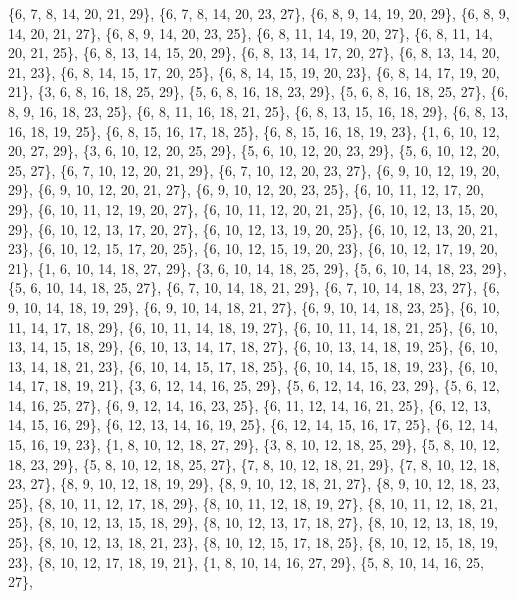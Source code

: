 \documentclass[11pt,a4paper]{article}
\begin{document}
{\{6, 7, 8, 14, 20, 21, 29\}, \{6, 7, 8, 14, 20, 23, 27\}, \{6, 8, 9, 14, 19, 20, 29\}, \{6, 8, 9, 14, 20, 21, 27\}, \{6, 8, 9, 14, 20, 23, 25\},
\{6, 8, 11, 14, 19, 20, 27\}, \{6, 8, 11, 14, 20, 21, 25\}, \{6, 8, 13, 14, 15, 20, 29\}, \{6, 8, 13, 14, 17, 20, 27\}, \{6, 8, 13, 14, 20, 21, 23\},
\{6, 8, 14, 15, 17, 20, 25\}, \{6, 8, 14, 15, 19, 20, 23\}, \{6, 8, 14, 17, 19, 20, 21\}, \{3, 6, 8, 16, 18, 25, 29\}, \{5, 6, 8, 16, 18, 23, 29\},
\{5, 6, 8, 16, 18, 25, 27\}, \{6, 8, 9, 16, 18, 23, 25\}, \{6, 8, 11, 16, 18, 21, 25\}, \{6, 8, 13, 15, 16, 18, 29\}, \{6, 8, 13, 16, 18, 19, 25\},
\{6, 8, 15, 16, 17, 18, 25\}, \{6, 8, 15, 16, 18, 19, 23\}, \{1, 6, 10, 12, 20, 27, 29\}, \{3, 6, 10, 12, 20, 25, 29\}, \{5, 6, 10, 12, 20, 23, 29\},
\{5, 6, 10, 12, 20, 25, 27\}, \{6, 7, 10, 12, 20, 21, 29\}, \{6, 7, 10, 12, 20, 23, 27\}, \{6, 9, 10, 12, 19, 20, 29\}, \{6, 9, 10, 12, 20, 21, 27\},
\{6, 9, 10, 12, 20, 23, 25\}, \{6, 10, 11, 12, 17, 20, 29\}, \{6, 10, 11, 12, 19, 20, 27\}, \{6, 10, 11, 12, 20, 21, 25\}, \{6, 10, 12, 13, 15, 20, 29\},
\{6, 10, 12, 13, 17, 20, 27\}, \{6, 10, 12, 13, 19, 20, 25\}, \{6, 10, 12, 13, 20, 21, 23\}, \{6, 10, 12, 15, 17, 20, 25\}, \{6, 10, 12, 15, 19, 20, 23\},
\{6, 10, 12, 17, 19, 20, 21\}, \{1, 6, 10, 14, 18, 27, 29\}, \{3, 6, 10, 14, 18, 25, 29\}, \{5, 6, 10, 14, 18, 23, 29\}, \{5, 6, 10, 14, 18, 25, 27\},
\{6, 7, 10, 14, 18, 21, 29\}, \{6, 7, 10, 14, 18, 23, 27\}, \{6, 9, 10, 14, 18, 19, 29\}, \{6, 9, 10, 14, 18, 21, 27\}, \{6, 9, 10, 14, 18, 23, 25\},
\{6, 10, 11, 14, 17, 18, 29\}, \{6, 10, 11, 14, 18, 19, 27\}, \{6, 10, 11, 14, 18, 21, 25\}, \{6, 10, 13, 14, 15, 18, 29\}, \{6, 10, 13, 14, 17, 18, 27\},
\{6, 10, 13, 14, 18, 19, 25\}, \{6, 10, 13, 14, 18, 21, 23\}, \{6, 10, 14, 15, 17, 18, 25\}, \{6, 10, 14, 15, 18, 19, 23\}, \{6, 10, 14, 17, 18, 19, 21\},
\{3, 6, 12, 14, 16, 25, 29\}, \{5, 6, 12, 14, 16, 23, 29\}, \{5, 6, 12, 14, 16, 25, 27\}, \{6, 9, 12, 14, 16, 23, 25\}, \{6, 11, 12, 14, 16, 21, 25\},
\{6, 12, 13, 14, 15, 16, 29\}, \{6, 12, 13, 14, 16, 19, 25\}, \{6, 12, 14, 15, 16, 17, 25\}, \{6, 12, 14, 15, 16, 19, 23\}, \{1, 8, 10, 12, 18, 27, 29\},
\{3, 8, 10, 12, 18, 25, 29\}, \{5, 8, 10, 12, 18, 23, 29\}, \{5, 8, 10, 12, 18, 25, 27\}, \{7, 8, 10, 12, 18, 21, 29\}, \{7, 8, 10, 12, 18, 23, 27\},
\{8, 9, 10, 12, 18, 19, 29\}, \{8, 9, 10, 12, 18, 21, 27\}, \{8, 9, 10, 12, 18, 23, 25\}, \{8, 10, 11, 12, 17, 18, 29\}, \{8, 10, 11, 12, 18, 19, 27\},
\{8, 10, 11, 12, 18, 21, 25\}, \{8, 10, 12, 13, 15, 18, 29\}, \{8, 10, 12, 13, 17, 18, 27\}, \{8, 10, 12, 13, 18, 19, 25\}, \{8, 10, 12, 13, 18, 21, 23\},
\{8, 10, 12, 15, 17, 18, 25\}, \{8, 10, 12, 15, 18, 19, 23\}, \{8, 10, 12, 17, 18, 19, 21\}, \{1, 8, 10, 14, 16, 27, 29\}, \{5, 8, 10, 14, 16, 25, 27\},
}
\end{document}
